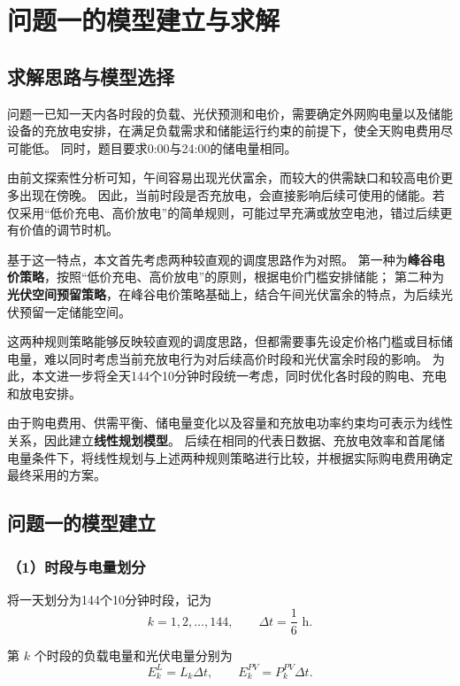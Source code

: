 \section{问题一的模型建立与求解}

\subsection{求解思路与模型选择}

问题一已知一天内各时段的负载、光伏预测和电价，需要确定外网购电量以及储能设备的充放电安排，在满足负载需求和储能运行约束的前提下，使全天购电费用尽可能低。
同时，题目要求0:00与24:00的储电量相同。

由前文探索性分析可知，午间容易出现光伏富余，而较大的供需缺口和较高电价更多出现在傍晚。
因此，当前时段是否充放电，会直接影响后续可使用的储能。若仅采用“低价充电、高价放电”的简单规则，可能过早充满或放空电池，错过后续更有价值的调节时机。

基于这一特点，本文首先考虑两种较直观的调度思路作为对照。
第一种为\textbf{峰谷电价策略}，按照“低价充电、高价放电”的原则，根据电价门槛安排储能；
第二种为\textbf{光伏空间预留策略}，在峰谷电价策略基础上，结合午间光伏富余的特点，为后续光伏预留一定储能空间。

这两种规则策略能够反映较直观的调度思路，但都需要事先设定价格门槛或目标储电量，难以同时考虑当前充放电行为对后续高价时段和光伏富余时段的影响。
为此，本文进一步将全天144个10分钟时段统一考虑，同时优化各时段的购电、充电和放电安排。

由于购电费用、供需平衡、储电量变化以及容量和充放电功率约束均可表示为线性关系，因此建立\textbf{线性规划模型}。
后续在相同的代表日数据、充放电效率和首尾储电量条件下，将线性规划与上述两种规则策略进行比较，并根据实际购电费用确定最终采用的方案。

\subsection{问题一的模型建立}

\subsubsection*{（1）时段与电量划分}

将一天划分为144个10分钟时段，记为
\[
k=1,2,\ldots,144,\qquad \Delta t=\frac{1}{6}\text{ h}.
\]

第 \(k\) 个时段的负载电量和光伏电量分别为
\begin{equation}
E_k^L=L_k\Delta t,\qquad
E_k^{PV}=P_k^{PV}\Delta t.
\label{eq:q1_energy}
\end{equation}

